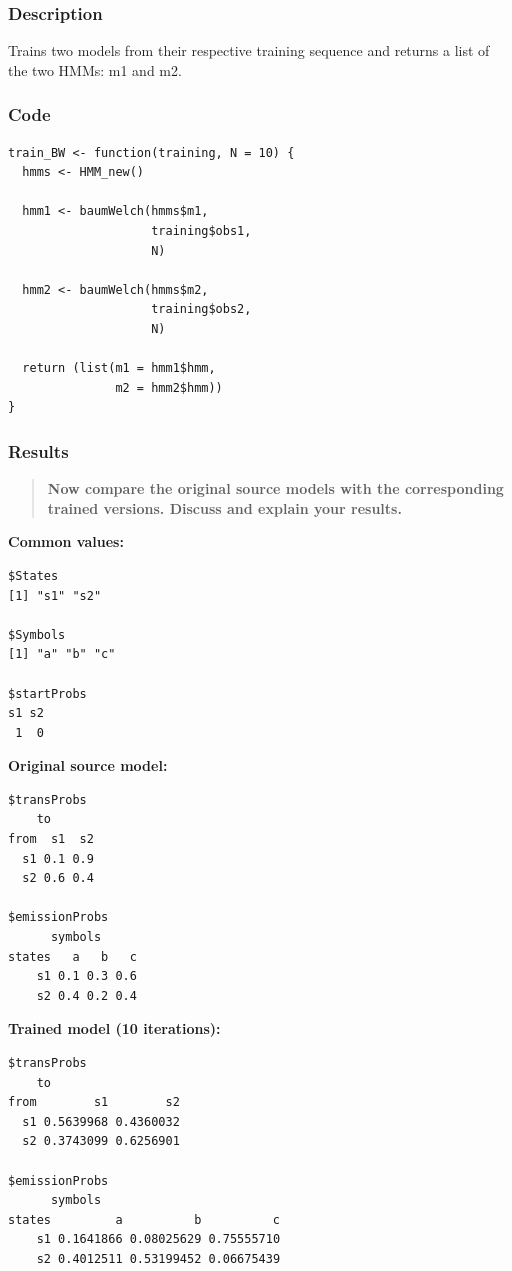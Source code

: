 \documentclass[a4paper]{article}
\begin{document}
\subsubsection{Description}

Trains two models from their respective training sequence and returns a list of the two HMMs: m1 and m2.

\subsubsection{Code}

\begin{lstlisting}
train_BW <- function(training, N = 10) {
  hmms <- HMM_new()
  
  hmm1 <- baumWelch(hmms$m1,
                    training$obs1,
                    N)

  hmm2 <- baumWelch(hmms$m2,
                    training$obs2,
                    N)
  
  return (list(m1 = hmm1$hmm,
               m2 = hmm2$hmm))
}
\end{lstlisting}

\subsubsection{Results}

\begin{quotation}
\textbf{Now compare the original source models with the corresponding trained versions. Discuss and explain your results.}
\end{quotation}

\textbf{Common values:}

\begin{lstlisting}
$States
[1] "s1" "s2"

$Symbols
[1] "a" "b" "c"

$startProbs
s1 s2 
 1  0 
\end{lstlisting}

\textbf{Original source model:}

\begin{lstlisting}
$transProbs
    to
from  s1  s2
  s1 0.1 0.9
  s2 0.6 0.4

$emissionProbs
      symbols
states   a   b   c
    s1 0.1 0.3 0.6
    s2 0.4 0.2 0.4
\end{lstlisting}

\textbf{Trained model (10 iterations):}

\begin{lstlisting}
$transProbs
    to
from        s1        s2
  s1 0.5639968 0.4360032
  s2 0.3743099 0.6256901

$emissionProbs
      symbols
states         a          b          c
    s1 0.1641866 0.08025629 0.75555710
    s2 0.4012511 0.53199452 0.06675439
\end{lstlisting}
\end{document}
